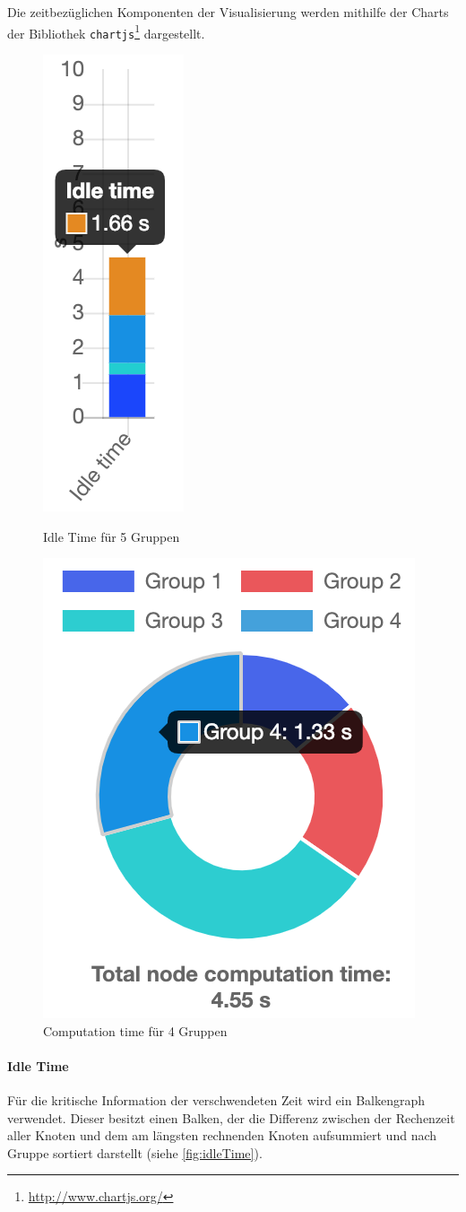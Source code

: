 Die zeitbezüglichen Komponenten der Visualisierung werden mithilfe der Charts
der Bibliothek \verb|chartjs|\footnote{\url{http://www.chartjs.org/}} dargestellt.
\begin{figure}
	\centering
	\begin{minipage}{.5\textwidth}
		\centering
		\includegraphics[height=.5\linewidth]{img/Implementierung/IdleTime}
		\caption{Idle Time für 5 Gruppen}
		\label{fig:idleTime}
	\end{minipage}%
	\begin{minipage}{.5\textwidth}
		\centering
		\includegraphics[height=.5\linewidth]{img/Implementierung/ComputationTime}
		\caption{Computation time für 4 Gruppen}
		\label{fig:computationTime}
	\end{minipage}
\end{figure}


\paragraph{Idle Time}
Für die kritische Information der verschwendeten Zeit wird ein Balkengraph verwendet.
Dieser besitzt einen Balken, der die Differenz zwischen der Rechenzeit aller Knoten und dem am längsten rechnenden Knoten
aufsummiert und nach Gruppe sortiert darstellt (siehe \autoref{fig:idleTime}).

